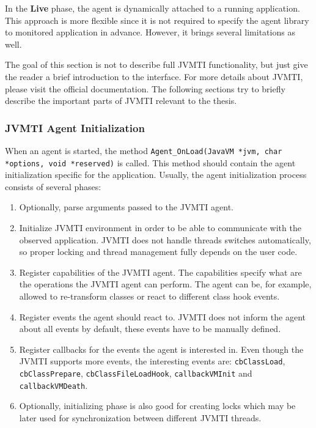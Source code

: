 In the \textbf{Live} phase, the agent is dynamically attached to a running application. This approach is more flexible since it is not required to specify the agent library to monitored application in advance. However, it brings several limitations as well.

The goal of this section is not to describe full JVMTI functionality, but just give the reader a brief introduction to the interface. For more details about JVMTI, please visit the official documentation. The following sections try to briefly describe the important parts of JVMTI relevant to the thesis.

\subsubsection{JVMTI Agent Initialization}
\label{subsec:jvmti_init}
When an agent is started, the method \newline \texttt{Agent\_OnLoad(JavaVM *jvm, char *options, void *reserved)} is called. This method should contain the agent initialization specific for the application. Usually, the agent initialization process consists of several phases:
\begin{enumerate}
	\item Optionally, parse arguments passed to the JVMTI agent.
	\item Initialize JVMTI environment in order to be able to communicate with the observed application. JVMTI does not handle threads switches automatically, so proper locking and thread management fully depends on the user code.
	\item Register capabilities of the JVMTI agent. The capabilities specify what are the operations the JVMTI agent can perform. The agent can be, for example, allowed to re-transform classes or react to different class hook events.
	\item Register events the agent should react to. JVMTI does not inform the agent about all events by default, these events have to be manually defined.
	\item Register callbacks for the events the agent is interested in. Even though the JVMTI supports more events, the interesting events are: \texttt{cbClassLoad}, \texttt{cbClassPrepare}, \texttt{cbClassFileLoadHook}, \texttt{callbackVMInit} and \texttt{callbackVMDeath}.
	\item Optionally, initializing phase is also good for creating locks which may be later used for synchronization between different JVMTI threads.
\end{enumerate}


